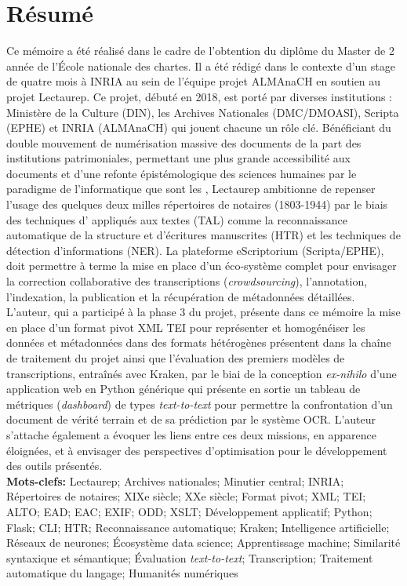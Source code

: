 \chapter*{Résumé}
Ce mémoire a été réalisé dans le cadre de l'obtention du diplôme du Master de 2 année  de l'École nationale des chartes. 
Il a été rédigé dans le contexte d'un stage de quatre mois à INRIA au sein de l'équipe projet ALMAnaCH en soutien au projet Lectaurep.
Ce projet, débuté en 2018, est porté par diverses institutions : Ministère de la Culture (DIN), les Archives Nationales (DMC/DMOASI), Scripta (EPHE) et INRIA (ALMAnaCH) qui jouent chacune un rôle clé. 
Bénéficiant du double mouvement de numérisation massive des documents de la part des institutions patrimoniales, permettant une plus grande accessibilité aux documents et d'une refonte épistémologique des sciences humaines par le paradigme de l'informatique que sont les , Lectaurep ambitionne de repenser l'usage des quelques deux milles répertoires de notaires (1803-1944) par le biais des techniques d' appliqués aux textes (TAL) comme la reconnaissance automatique de la structure et d'écritures manuscrites (HTR) et les techniques de détection d'informations (NER). 
La plateforme eScriptorium (Scripta/EPHE), doit permettre à terme la mise en place d'un éco-système complet pour envisager la correction collaborative des transcriptions (\textit{crowdsourcing}), l'annotation, l'indexation, la publication et la récupération de métadonnées détaillées.
L'auteur, qui a participé à la phase 3 du projet, présente dans ce mémoire la mise en place d'un format pivot XML TEI pour représenter et homogénéiser les données et métadonnées dans des formats hétérogènes présentent dans la chaîne de traitement du projet ainsi que l'évaluation des premiers modèles de transcriptions, entraînés avec Kraken, par le biai de la conception \textit{ex-nihilo} d'une application web en Python générique qui présente en sortie un tableau de métriques (\textit{dashboard}) de types \textit{text-to-text} pour permettre la confrontation d'un document de vérité terrain et de sa prédiction par le système OCR.
L'auteur s'attache également a évoquer les liens entre ces deux missions, en apparence éloignées, et à envisager des perspectives d'optimisation pour le développement des outils présentés.\\
\bigskip
\textbf{Mots-clefs:} Lectaurep; Archives nationales; Minutier central; INRIA; Répertoires de notaires; XIXe siècle; XXe siècle; Format pivot; XML; TEI; ALTO; EAD; EAC; EXIF; ODD; XSLT; Développement applicatif; Python; Flask; CLI; HTR; Reconnaissance automatique; Kraken; Intelligence artificielle; Réseaux de neurones; Écosystème data science; Apprentissage machine; Similarité syntaxique et sémantique; Évaluation \textit{text-to-text}; Transcription; Traitement automatique du langage; Humanités numériques

